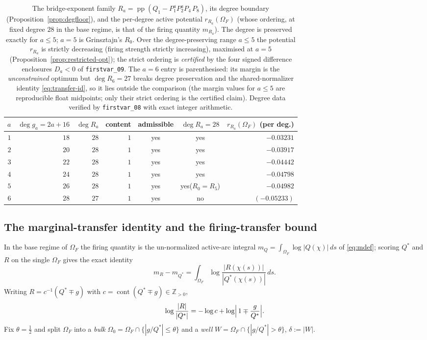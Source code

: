 \documentclass[11pt,reqno]{amsart}
\theoremstyle{plain}
\theoremstyle{definition}
\newcommand{\Z}{\mathbb{Z}}
\DeclareMathOperator{\pp}{pp}
\newcommand{\rb}[1]{r_{#1}}   %
\begin{document}
\begin{table}[h]
\centering\small
\renewcommand{\arraystretch}{1.2}
\begin{tabular}{@{}rrrrccr@{}}
\toprule
$a$ & $\deg g_a=2a+16$ & $\deg R_a$ & content & admissible & $\deg R_a=28$ & $\rb{R_a}(\Omega_F)$ (per deg.)\\
\midrule
$1$ & $18$ & $28$ & $1$ & yes & yes & $-0.03231$\\
$2$ & $20$ & $28$ & $1$ & yes & yes & $-0.03917$\\
$3$ & $22$ & $28$ & $1$ & yes & yes & $-0.04442$\\
$4$ & $24$ & $28$ & $1$ & yes & yes & $-0.04798$\\
$5$ & $26$ & $28$ & $1$ & yes & yes\quad($R_0=R_5$) & $-0.04982$\\
$6$ & $28$ & $27$ & $1$ & yes & no & $(-0.05233)$\\
\bottomrule
\end{tabular}
\medskip
\caption{The bridge-exponent family $R_a=\pp(Q_1-P_1^aP_2^aP_4\,P_8)$, its degree
boundary (Proposition~\ref{prop:degfloor}), and the per-degree active potential
$\rb{R_a}(\Omega_F)$ (whose ordering, at fixed degree $28$ in the base regime, is that of
the firing quantity $m_{R_a}$). The degree is preserved exactly for $a\le5$; $a=5$ is
Grinsztajn's $R_0$. Over the degree-preserving range $a\le5$ the potential
$\rb{R_a}$ is strictly decreasing (firing strength strictly increasing),
maximised at $a=5$ (Proposition~\ref{prop:restricted-opt}); the strict ordering is
\emph{certified} by the four signed difference enclosures $D_a<0$ of
\texttt{firstvar\_09}. The $a=6$ entry is parenthesised: its margin is the
\emph{unconstrained} optimum but $\deg R_6=27$ breaks degree preservation and the
shared-normalizer identity \eqref{eq:transfer-id}, so it lies outside the comparison
(the margin values for $a\le5$ are reproducible float midpoints; only their strict
ordering is the certified claim). Degree data verified by \texttt{firstvar\_08} with
exact integer arithmetic.}
\label{tab:degfloor}
\end{table}

\subsection*{The marginal-transfer identity and the firing-transfer bound}
In the base regime of $\Omega_F$ the firing quantity is the un-normalized active-arc
integral $m_Q=\int_{\Omega_F}\log|Q(\chi)|\,ds$ of \eqref{eq:mdef}; scoring $Q^*$ and $R$
on the single $\Omega_F$ gives the exact identity
\begin{equation}\label{eq:transfer-id}
  m_R-m_{Q^*}=\int_{\Omega_F}\log\frac{|R(\chi(s))|}{|Q^*(\chi(s))|}\,ds .
\end{equation}
Writing $R=c^{-1}(Q^*\mp g)$ with $c=\operatorname{cont}(Q^*\mp g)\in\Z_{>0}$,
\[
  \log\frac{|R|}{|Q^*|}=-\log c+\log\Bigl|\,1\mp\frac{g}{Q^*}\Bigr| .
\]
Fix $\theta=\tfrac12$ and split $\Omega_F$ into a \emph{bulk}
$\Omega_0=\Omega_F\cap\{|g/Q^*|\le\theta\}$ and a \emph{well}
$W=\Omega_F\cap\{|g/Q^*|>\theta\}$, $\delta:=|W|$.
\end{document}
